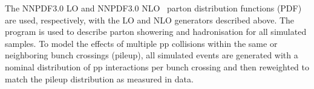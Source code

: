
The \textsc{NNPDF}3.0 LO and \textsc{NNPDF}3.0 NLO~\cite{nnpdf} parton
distribution functions (PDF) are used, respectively, with the LO and
NLO generators described above. The ~\cite{pythia} program
is used to describe parton showering and hadronisation for all
simulated samples. To model the effects of multiple pp collisions
within the same or neighboring bunch crossings (pileup), all simulated
events are generated with a nominal distribution of pp interactions
per bunch crossing and then reweighted to match the pileup
distribution as measured in data.



